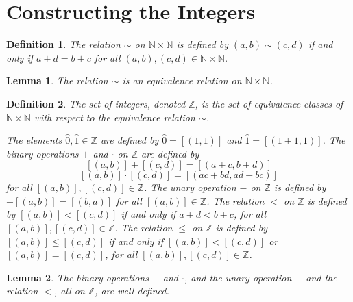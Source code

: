 \documentclass{article}
\newtheorem*{lemma}{Lemma}
\newtheorem*{definition}{Definition}
\newcommand{\N}{\mathbb{N}}
\newcommand{\Z}{\mathbb{Z}}
\begin{document}
\section{Constructing the Integers}

\begin{definition}
	The relation $\sim$ on $\N \times \N$ is defined by $(a,b)\sim(c,d)$ if and only if $a+d = b+c$ for all $(a,b),(c,d)\in \N \times \N$.
\end{definition}

\begin{lemma}
	The relation $\sim$ is an equivalence relation on $\N \times \N$.
\end{lemma}

\begin{definition}
	The set of integers, denoted $\Z$, is the set of equivalence classes of $\N \times \N$ with respect to the equivalence relation $\sim$.

	The elements $\hat{0}, \hat{1} \in \Z$ are defined by $\hat{0} = [(1, 1)]$ and $\hat{1} = [(1 + 1, 1)]$. The binary operations $+$ and $\cdot$ on $\Z$ are defined by
	\[ [(a,b)] + [(c,d)] = [(a + c, b + d)] \]
	\[ [(a,b)] \cdot [(c,d)] = [(ac + bd, ad + bc)] \]
	for all $[(a,b)], [(c,d)] \in \Z$. The unary operation $-$ on $\Z$ is defined by $-[(a,b)] = [(b,a)]$ for all $[(a,b)] \in \Z$. The relation $<$ on $\Z$ is defined by $[(a,b)] < [(c,d)]$ if and only if $a + d < b + c$, for all $[(a,b)],[(c,d)] \in \Z$. The relation $\le$ on $\Z$ is defined by $[(a,b)] \le [(c,d)]$ if and only if $[(a,b)] < [(c,d)]$ or $[(a,b)] = [(c,d)]$, for all $[(a,b)], [(c,d)] \in \Z$.
\end{definition}

\begin{lemma}
	The binary operations $+$ and $\cdot$, and the unary operation $-$ and the relation $<$, all on $\Z$, are well-defined.
\end{lemma}
\end{document}
